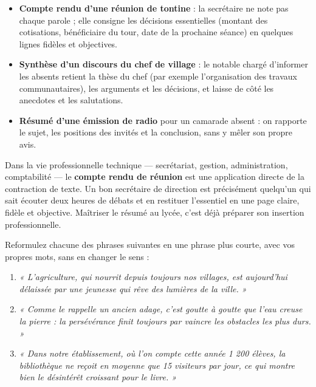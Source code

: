 \documentclass[11pt]{article}
\begin{document}
\begin{itemize}
\item \textbf{Compte rendu d'une réunion de tontine} : la secrétaire ne note pas chaque parole ; elle consigne les décisions essentielles (montant des cotisations, bénéficiaire du tour, date de la prochaine séance) en quelques lignes fidèles et objectives.
\item \textbf{Synthèse d'un discours du chef de village} : le notable chargé d'informer les absents retient la thèse du chef (par exemple l'organisation des travaux communautaires), les arguments et les décisions, et laisse de côté les anecdotes et les salutations.
\item \textbf{Résumé d'une émission de radio} pour un camarade absent : on rapporte le sujet, les positions des invités et la conclusion, sans y mêler son propre avis.
\end{itemize}

\begin{savaistu}
Dans la vie professionnelle technique — secrétariat, gestion, administration, comptabilité — le \textbf{compte rendu de réunion} est une application directe de la contraction de texte. Un bon secrétaire de direction est précisément quelqu'un qui sait écouter deux heures de débats et en restituer l'essentiel en une page claire, fidèle et objective. Maîtriser le résumé au lycée, c'est déjà préparer son insertion professionnelle.
\end{savaistu}

\begin{exercice}
Reformulez chacune des phrases suivantes en une phrase plus courte, avec vos propres mots, sans en changer le sens :
\begin{enumerate}
\item \emph{« L'agriculture, qui nourrit depuis toujours nos villages, est aujourd'hui délaissée par une jeunesse qui rêve des lumières de la ville. »}
\item \emph{« Comme le rappelle un ancien adage, c'est goutte à goutte que l'eau creuse la pierre : la persévérance finit toujours par vaincre les obstacles les plus durs. »}
\item \emph{« Dans notre établissement, où l'on compte cette année 1 200 élèves, la bibliothèque ne reçoit en moyenne que 15 visiteurs par jour, ce qui montre bien le désintérêt croissant pour le livre. »}
\end{enumerate}
\end{exercice}
\end{document}
